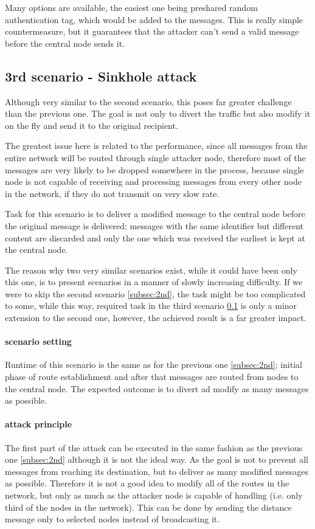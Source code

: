 \documentclass[
  print, %
  table,   %
  nolof,     %
  nolot,     %
           oneside
]{fithesis3}
\begin{document}
    Many options are available, the easiest one being preshared random authentication tag, which would be added to the messages. This is really simple countermeasure, but it guarantees that the attacker can't send a valid message before the central node sends it.

    \subsection{3rd scenario - Sinkhole attack}\label{subsec:3rd}
    Although very similar to the second scenario, this poses far greater challenge than the previous one. The goal is not only to divert the traffic but also modify it on the fly and send it to the original recipient.

    The greatest issue here is related to the performance, since all messages from the entire network will be routed through single attacker node, therefore most of the messages are very likely to be dropped somewhere in the process, because single node is not capable of receiving and processing messages from every other node in the network, if they do not transmit on very slow rate.

    Task for this scenario is to deliver a modified message to the central node before the original message is delivered; messages with the same identifier but different content are discarded and only the one which was received the earliest is kept at the central node.

    The reason why two very similar scenarios exist, while it could have been only this one, is to present scenarios in a manner of slowly increasing difficulty. If we were to skip the second scenario \ref{subsec:2nd}, the task might be too complicated to some, while this way, required task in the third scenario \ref{subsec:3rd} is only a minor extension to the second one, however, the achieved result is a far greater impact.

    \paragraph{scenario setting}
    Runtime of this scenario is the same as for the previous one \ref{subsec:2nd}; initial phase of route establishment and after that messages are routed from nodes to the central node. The expected outcome is to divert ad modify as many messages as possible.

    \paragraph{attack principle}
    The first part of the attack can be executed in the same fashion as the previous one \ref{subsec:2nd} although it is not the ideal way. As the goal is not to prevent all messages from reaching its destination, but to deliver as many modified messages as possible. Therefore it is not a good idea to modify all of the routes in the network, but only as much as the attacker node is capable of handling (i.e. only third of the nodes in the network). This can be done by sending the distance message only to selected nodes instead of broadcasting it.
\end{document}
